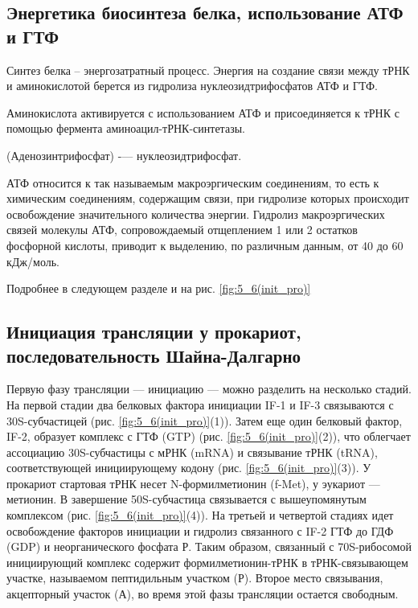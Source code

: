 \subsection{Энергетика биосинтеза белка, использование АТФ и ГТФ}

Синтез белка -- энергозатратный процесс. Энергия на создание связи между тРНК и аминокислотой берется из гидролиза нуклеозидтрифосфатов АТФ и ГТФ.

Аминокислота активируется с использованием АТФ и присоединяется к тРНК с помощью фермента аминоацил-тРНК-синтетазы.

(Аденозинтрифосфат) -— нуклеозидтрифосфат.  

АТФ относится к так называемым макроэргическим соединениям, то есть к химическим соединениям, содержащим связи, при гидролизе которых происходит освобождение значительного количества энергии. Гидролиз макроэргических связей молекулы АТФ, сопровождаемый отщеплением 1 или 2 остатков фосфорной кислоты, приводит к выделению, по различным данным, от 40 до 60 кДж/моль. 

Подробнее в следующем разделе и на рис. \ref{fig:5_6(init_pro)}

\subsection{Инициация трансляции у прокариот, последовательность Шайна-Далгарно}


Первую фазу трансляции — инициацию — можно разделить на несколько стадий. На первой стадии два белковых фактора инициации IF-1 и IF-3 связываются с 30S-субчастицей (рис. \ref{fig:5_6(init_pro)}(1)). Затем еще один белковый фактор, IF-2, образует комплекс с ГТФ (GTP) (рис. \ref{fig:5_6(init_pro)}(2)), что облегчает ассоциацию 30S-субчастицы с мРНК (mRNA) и связывание тРНК (tRNA), соответствующей инициирующему кодону (рис. \ref{fig:5_6(init_pro)}(3)). У прокариот стартовая тРНК несет N-формилметионин (f-Met), у эукариот — метионин. В завершение 50S-субчастица связывается с вышеупомянутым комплексом (рис. \ref{fig:5_6(init_pro)}(4)). На третьей и четвертой стадиях идет освобождение факторов инициации и гидролиз связанного с IF-2 ГТФ до ГДФ (GDP) и неорганического фосфата Р. Таким образом, связанный с 70S-рибосомой инициирующий комплекс содержит формилметионин-тРНК в тРНК-связывающем участке, называемом пептидильным участком (Р). Второе место связывания, акцепторный участок (А), во время этой фазы трансляции остается свободным.

